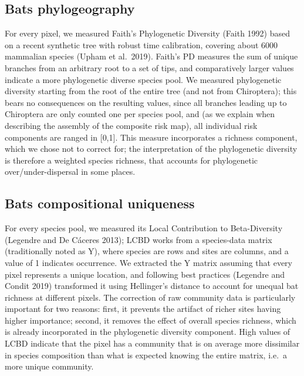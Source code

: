 \documentclass[11pt]{article}
\begin{document}
\hypertarget{bats-phylogeography}{%
\subsection{Bats phylogeography}\label{bats-phylogeography}}

For every pixel, we measured Faith's Phylogenetic Diversity (Faith 1992)
based on a recent synthetic tree with robust time calibration, covering
about 6000 mammalian species (Upham et al.~2019). Faith's PD measures
the sum of unique branches from an arbitrary root to a set of tips, and
comparatively larger values indicate a more phylogenetic diverse species
pool. We measured phylogenetic diversity starting from the root of the
entire tree (and not from Chiroptera); this bears no consequences on the
resulting values, since all branches leading up to Chiroptera are only
counted one per species pool, and (as we explain when describing the
assembly of the composite risk map), all individual risk components are
ranged in {[}0,1{]}. This measure incorporates a richness component,
which we chose not to correct for; the interpretation of the
phylogenetic diversity is therefore a weighted species richness, that
accounts for phylogenetic over/under-dispersal in some places.

\hypertarget{bats-compositional-uniqueness}{%
\subsection{Bats compositional
uniqueness}\label{bats-compositional-uniqueness}}

For every species pool, we measured its Local Contribution to
Beta-Diversity (Legendre and De Cáceres 2013); LCBD works from a
species-data matrix (traditionally noted as Y), where species are rows
and sites are columns, and a value of 1 indicates occurrence. We
extracted the Y matrix assuming that every pixel represents a unique
location, and following best practices (Legendre and Condit 2019)
transformed it using Hellinger's distance to account for unequal bat
richness at different pixels. The correction of raw community data is
particularly important for two reasons: first, it prevents the artifact
of richer sites having higher importance; second, it removes the effect
of overall species richness, which is already incorporated in the
phylogenetic diversity component. High values of LCBD indicate that the
pixel has a community that is on average more dissimilar in species
composition than what is expected knowing the entire matrix, i.e.~a more
unique community.
\end{document}

